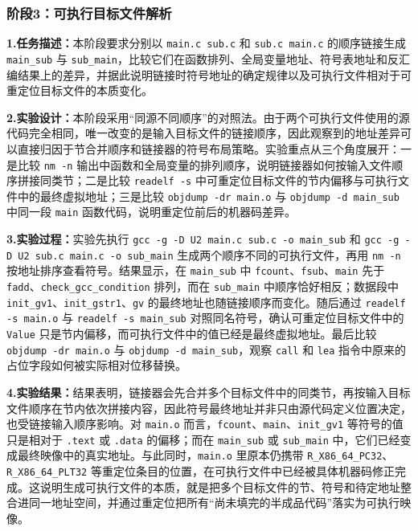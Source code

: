 \documentclass[supercite]{Experimental_Report}
\theoremstyle{definition}
\begin{document}
\subsubsection{阶段3：可执行目标文件解析}
\noindent\textbf{1.任务描述：}本阶段要求分别以 \texttt{main.c sub.c} 和 \texttt{sub.c main.c} 的顺序链接生成 \texttt{main\_sub} 与 \texttt{sub\_main}，比较它们在函数排列、全局变量地址、符号表地址和反汇编结果上的差异，并据此说明链接时符号地址的确定规律以及可执行文件相对于可重定位目标文件的本质变化。

\noindent\textbf{2.实验设计：}本阶段采用“同源不同顺序”的对照法。由于两个可执行文件使用的源代码完全相同，唯一改变的是输入目标文件的链接顺序，因此观察到的地址差异可以直接归因于节合并顺序和链接器的符号布局策略。实验重点从三个角度展开：一是比较 \texttt{nm -n} 输出中函数和全局变量的排列顺序，说明链接器如何按输入文件顺序拼接同类节；二是比较 \texttt{readelf -s} 中可重定位目标文件的节内偏移与可执行文件中的最终虚拟地址；三是比较 \texttt{objdump -dr main.o} 与 \texttt{objdump -d main\_sub} 中同一段 \texttt{main} 函数代码，说明重定位前后的机器码差异。

\noindent\textbf{3.实验过程：}实验先执行 \texttt{gcc -g -D U2 main.c sub.c -o main\_sub} 和 \texttt{gcc -g -D U2 sub.c main.c -o sub\_main} 生成两个顺序不同的可执行文件，再用 \texttt{nm -n} 按地址排序查看符号。结果显示，在 \texttt{main\_sub} 中 \texttt{fcount}、\texttt{fsub}、\texttt{main} 先于 \texttt{fadd}、\texttt{check\_gcc\_condition} 排列，而在 \texttt{sub\_main} 中顺序恰好相反；数据段中 \texttt{init\_gv1}、\texttt{init\_gstr1}、\texttt{gv} 的最终地址也随链接顺序而变化。随后通过 \texttt{readelf -s main.o} 与 \texttt{readelf -s main\_sub} 对照同名符号，确认可重定位目标文件中的 \texttt{Value} 只是节内偏移，而可执行文件中的值已经是最终虚拟地址。最后比较 \texttt{objdump -dr main.o} 与 \texttt{objdump -d main\_sub}，观察 \texttt{call} 和 \texttt{lea} 指令中原来的占位字段如何被实际相对位移替换。

\noindent\textbf{4.实验结果：}结果表明，链接器会先合并多个目标文件中的同类节，再按输入目标文件顺序在节内依次拼接内容，因此符号最终地址并非只由源代码定义位置决定，也受链接输入顺序影响。对 \texttt{main.o} 而言，\texttt{fcount}、\texttt{main}、\texttt{init\_gv1} 等符号的值只是相对于 \texttt{.text} 或 \texttt{.data} 的偏移；而在 \texttt{main\_sub} 或 \texttt{sub\_main} 中，它们已经变成最终映像中的真实地址。与此同时，\texttt{main.o} 里原本仍携带 \texttt{R\_X86\_64\_PC32}、\texttt{R\_X86\_64\_PLT32} 等重定位条目的位置，在可执行文件中已经被具体机器码修正完成。这说明生成可执行文件的本质，就是把多个目标文件的节、符号和待定地址整合进同一地址空间，并通过重定位把所有“尚未填完的半成品代码”落实为可执行映像。
\end{document}
